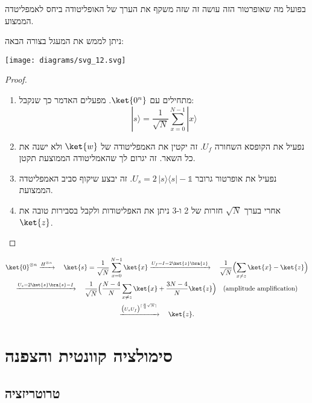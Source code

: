 \documentclass{tstextbook}
\begin{document}
\begin{remark}
בפועל מה שאופרטור הזה עושה זה שזה משקף את הערך של האופליטודה ביחס לאמפליטדה הממצוע.

\end{remark}
\begin{proposition}
ניתן לממש את המעגל בצורה הבאה:

\texttt{[image: diagrams/svg\_12.svg]}
\end{proposition}
\begin{proof}
  \begin{enumerate}
    \item מתחילים עם \(\ket{0^{n}}\). מפעלים האדמר כך שנקבל: 
$$|s\rangle={\frac{1}{\sqrt{N}}}\sum_{x=0}^{N-1}|x\rangle$$


    \item נפעיל את הקופסא השחורה \(U_{f}\). זה יקטין את האמפליטודה של \(\ket{w}\) ולא ישנה את כל השאר. זה יגרום לך שהאמליטודה הממוצעת תקטן. 


    \item נפעיל את אופרטור גרובר \(U_{s}=2\,|s\rangle\!\langle s|-\mathbb{1}\). זה יבצע שיקוף סביב האמפליטדה הממצועת.  


    \item אחרי בערך \(\sqrt{ N }\) חזרות של 2 ו-3 ניתן את האפליטודות ולקבל בסבירות טובה את \(\ket{z}\). 


  \end{enumerate}
\end{proof}
\begin{summary}
$$\begin{gather*}\ket{0}^{\otimes n} \xrightarrow{H^{\otimes n}} \quad \ket{s} = \frac{1}{\sqrt{N}}\sum_{x=0}^{N-1}\ket{x} \xrightarrow{U_f = I-2\ket{z}\bra{z}} \quad \frac{1}{\sqrt{N}}\Bigl(\sum_{x\neq z}\ket{x} - \ket{z}\Bigr) \\\xrightarrow{U_s = 2\ket{s}\bra{s}-I} \quad \frac{1}{\sqrt{N}}\Bigl(\frac{N-4}{N}\sum_{x\neq z}\ket{x} + \frac{3N-4}{N}\ket{z}\Bigr) \quad \text{(amplitude amplification)} \\\xrightarrow{\bigl(U_sU_f\bigr)^{\lceil \frac{\pi}{4}\sqrt{N}\rceil}} \quad \ket{z}.
\end{gather*}$$

\end{summary}
\section{סימולציה קוונטית והצפנה}

\subsection{טרוטריזציה}
\end{document}
